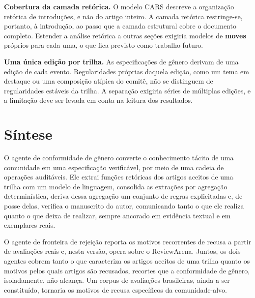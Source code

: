 
\textbf{Cobertura da camada retórica.} O modelo CARS descreve a organização retórica de introduções, e não do artigo inteiro. A camada retórica restringe-se, portanto, à introdução, ao passo que a camada estrutural cobre o documento completo. Estender a análise retórica a outras seções exigiria modelos de \textbf{moves} próprios para cada uma, o que fica previsto como trabalho futuro.

\textbf{Uma única edição por trilha.} As especificações de gênero derivam de uma edição de cada evento. Regularidades próprias daquela edição, como um tema em destaque ou uma composição atípica do comitê, não se distinguem de regularidades estáveis da trilha. A separação exigiria séries de múltiplas edições, e a limitação deve ser levada em conta na leitura dos resultados.


\section{Síntese}
\label{sec:sintese-solucao}

O agente de conformidade de gênero converte o conhecimento tácito de uma comunidade em uma especificação verificável, por meio de uma cadeia de operações auditáveis. Ele extrai funções retóricas dos artigos aceitos de uma trilha com um modelo de linguagem, consolida as extrações por agregação determinística, deriva dessa agregação um conjunto de regras explicitadas e, de posse delas, verifica o manuscrito do autor, comunicando tanto o que ele realiza quanto o que deixa de realizar, sempre ancorado em evidência textual e em exemplares reais.

O agente de fronteira de rejeição reporta os motivos recorrentes de recusa a partir de avaliações reais e, nesta versão, opera sobre o ReviewArena. Juntos, os dois agentes cobrem tanto o que caracteriza os artigos aceitos de uma trilha quanto os motivos pelos quais artigos são recusados, recortes que a conformidade de gênero, isoladamente, não alcança. Um corpus de avaliações brasileiras, ainda a ser constituído, tornaria os motivos de recusa específicos da comunidade-alvo.